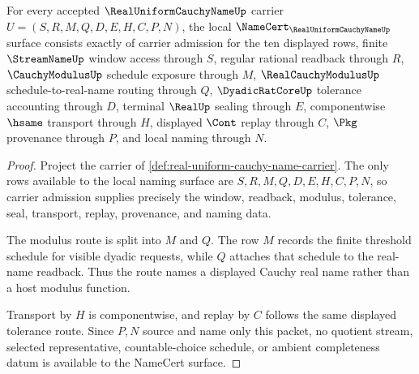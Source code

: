 \begin{theorem}
\label{thm:real-uniform-cauchy-name-namecert-obligations}
For every accepted $\RealUniformCauchyNameUp$ carrier $U=(S,R,M,Q,D,E,H,C,P,N)$, the local $\NameCert_{\RealUniformCauchyNameUp}$ surface consists exactly of carrier admission for the ten displayed rows, finite $\StreamNameUp$ window access through $S$, regular rational readback through $R$, $\CauchyModulusUp$ schedule exposure through $M$, $\RealCauchyModulusUp$ schedule-to-real-name routing through $Q$, $\DyadicRatCoreUp$ tolerance accounting through $D$, terminal $\RealUp$ sealing through $E$, componentwise $\hsame$ transport through $H$, displayed $\Cont$ replay through $C$, $\Pkg$ provenance through $P$, and local naming through $N$.
\end{theorem}
\begin{proof}
Project the carrier of \autoref{def:real-uniform-cauchy-name-carrier}. The only rows available to the local naming surface are $S,R,M,Q,D,E,H,C,P,N$, so carrier admission supplies precisely the window, readback, modulus, tolerance, seal, transport, replay, provenance, and naming data.

The modulus route is split into $M$ and $Q$. The row $M$ records the finite threshold schedule for visible dyadic requests, while $Q$ attaches that schedule to the real-name readback. Thus the route names a displayed Cauchy real name rather than a host modulus function.

Transport by $H$ is componentwise, and replay by $C$ follows the same displayed tolerance route. Since $P,N$ source and name only this packet, no quotient stream, selected representative, countable-choice schedule, or ambient completeness datum is available to the NameCert surface.
\end{proof}

